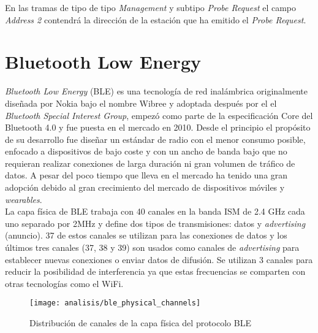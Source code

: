 \documentclass[../proyecto.tex]{subfiles}
\begin{document}
En las tramas de tipo de tipo \textit{Management} y subtipo \textit{Probe Request} el campo \textit{Address 2} contendrá la dirección de la estación que ha emitido el \textit{Probe Request}.\\


\section{Bluetooth Low Energy}

\textit{Bluetooth Low Energy} (BLE) es una tecnología de red inalámbrica originalmente diseñada por Nokia bajo el nombre Wibree y adoptada después por el  el \textit{Bluetooth Special Interest Group}, empezó como parte de la especificación Core del Bluetooth 4.0 y fue puesta en el mercado en 2010. Desde el principio el propósito de su desarrollo fue diseñar un estándar de radio con el menor consumo posible, enfocado a dispositivos de bajo coste y con un ancho de banda bajo que no requieran realizar conexiones de larga duración ni gran volumen de tráfico de datos. A pesar del poco tiempo que lleva en el mercado ha tenido una gran adopción debido al gran crecimiento del mercado de dispositivos móviles y \textit{wearables}.\\

La capa física de BLE trabaja con 40 canales en la banda ISM de 2.4 GHz cada uno separado por 2MHz y define dos tipos de transmisiones: datos y \textit{advertising} (anuncio). 37 de estos canales se utilizan para las conexiones de datos y los últimos tres canales (37, 38 y 39) son usados como canales de \textit{advertising} para establecer nuevas conexiones o enviar datos de difusión. Se utilizan 3 canales para reducir la posibilidad de interferencia ya que estas frecuencias se comparten con otras tecnologías como el WiFi.

\begin{figure}[H]
\centering
\texttt{[image: analisis/ble\_physical\_channels]}
\caption{Distribución de canales de la capa física del protocolo BLE \cite{townsend2014getting}}
\label{fig:ble_physical_channels}
\end{figure}
\end{document}
